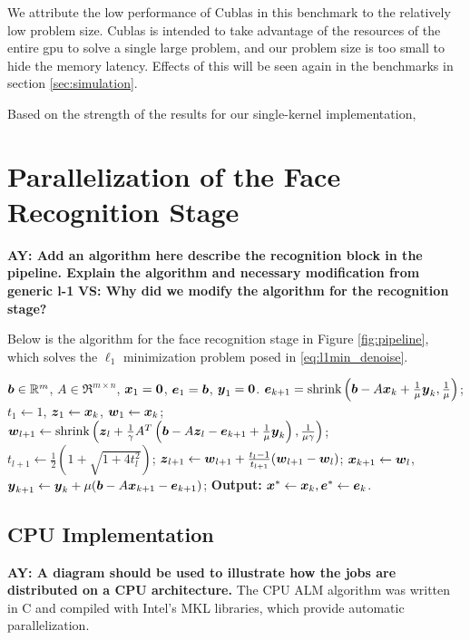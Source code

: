 \documentclass[10pt,twocolumn,letterpaper]{article}
\begin{document}
We attribute the low performance of Cublas in this benchmark to the relatively
low problem size. Cublas is intended to take advantage of the resources of the
entire gpu to solve a single large problem, and our problem size is too small
to hide the memory latency.  Effects of this will be seen again in the
benchmarks in section \ref{sec:simulation}.

Based on the strength of the results for our single-kernel implementation, 

\section{Parallelization of the Face Recognition Stage}
\label{sec:recognition}
{\bf AY: Add an algorithm here describe the recognition block in the pipeline. Explain the algorithm and necessary modification from generic l-1}
{\bf VS: Why did we modify the algorithm for the recognition stage? }

Below is the algorithm for the face recognition stage in Figure \ref{fig:pipeline}, which
solves the $\ell_1$ minimization problem posed in \eqref{eq:l1min_denoise}. 

\begin{algorithm}[t]
\caption{\bf (Face Recognition via ALM)}
\begin{algorithmic}[1]
\begin{small}
 ${\boldsymbol{b}} \in {\mathbb{R}}^m$, $A \in \Re^{m \times n}$,
${\boldsymbol{x}}_1 = \boldsymbol{0}$, $\boldsymbol{e}_1 = {\boldsymbol{b}}$, $\boldsymbol{y}_1 =
\boldsymbol{0}$.
\STATE $\boldsymbol{e}_{k+1} = \textup{shrink}\left({\boldsymbol{b}} - A{\boldsymbol{x}}_k +
\frac{1}{\mu}\boldsymbol{y}_k, \frac{1}{\mu}\right)$;
\STATE $t_1\leftarrow 1$, $\boldsymbol{z}_1 \leftarrow {\boldsymbol{x}}_k$, $\boldsymbol{w}_1 \leftarrow {\boldsymbol{x}}_k$;
\STATE $\boldsymbol{w}_{l+1} \leftarrow \textup{shrink}\left(\boldsymbol{z}_l +
\frac{1}{\gamma}A^T\left({\boldsymbol{b}} - A\boldsymbol{z}_l - \boldsymbol{e}_{k+1} +
\frac{1}{\mu}\boldsymbol{y}_k\right), \frac{1}{\mu\gamma}\right)$;
\STATE $t_{l+1} \leftarrow \frac{1}{2}\left( 1 +
\sqrt{1+4t_l^2}\right)$;
\STATE $\boldsymbol{z}_{l+1} \leftarrow \boldsymbol{w}_{l+1} + \frac{t_l - 1}{t_{l+1}}(\boldsymbol{w}_{l+1} - \boldsymbol{w}_l)$;
\ENDWHILE
\STATE ${\boldsymbol{x}}_{k+1} \leftarrow \boldsymbol{w}_{l}$,  \; $\boldsymbol{y}_{k+1} \leftarrow \boldsymbol{y}_k + \mu ({\boldsymbol{b}} - A{\boldsymbol{x}}_{k+1} - \boldsymbol{e}_{k+1})$;
\ENDWHILE \STATE
{\bf Output:} ${\boldsymbol{x}}^* \leftarrow {\boldsymbol{x}}_k, \boldsymbol{e}^* \leftarrow \boldsymbol{e}_k$.
\end{small}
\end{algorithmic}
\label{alg:alm_rec} 
\end{algorithm}


\subsection{CPU Implementation}
{\bf AY: A diagram should be used to illustrate how the jobs are distributed on a CPU architecture.}
The CPU ALM algorithm was written in C and compiled with Intel's MKL libraries, which provide
automatic parallelization.  
\end{document}

